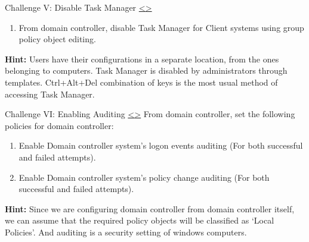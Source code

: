 \documentclass[12pt]{extarticle}
\newenvironment{instructionblock}{\Large\bgroup}{\egroup}
\begin{document}
\vfill




\pagebreak
\begin{slide}{ Challenge V: Disable Task Manager }{\hyperref[slide 22]{\textless}\hyperref[slide 24]{\textgreater}}
\begin{instructionblock}
\begin{enumerate}
\item From domain controller, disable Task Manager for Client systems using group policy object editing.
    
\end{enumerate}
\end{instructionblock}
\end{slide}

\vspace{2mm}
\noindent
\textbf{Hint:} Users have their configurations in a separate location, from the ones belonging to computers. Task Manager is disabled by administrators through templates. Ctrl+Alt+Del combination of keys is the most usual method of accessing Task Manager.

\vfill




\pagebreak
\begin{slide}{ Challenge VI: Enabling Auditing }{\hyperref[slide 23]{\textless}\hyperref[slide 25]{\textgreater}}
	\begin{instructionblock}
		From domain controller, set the following policies for domain controller:
		\begin{enumerate}
			\item Enable Domain controller system's logon events auditing (For both successful and failed attempts).
			\item Enable Domain controller system's policy change auditing (For both successful and failed attempts).
		\end{enumerate}
	\end{instructionblock}
\end{slide}

\vspace{2mm}
\noindent
\textbf{Hint:} Since we are configuring domain controller from domain controller itself, we can assume that the required policy objects will be classified as `Local Policies'. And auditing is a security setting of windows computers.
\end{document}
